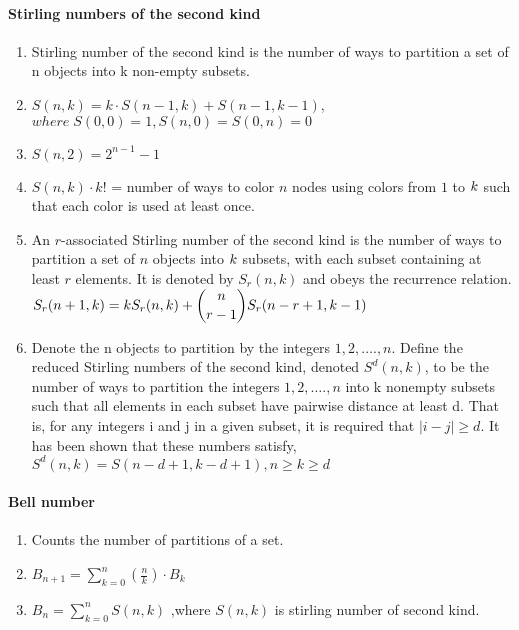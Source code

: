 \paragraph{Stirling numbers of the second kind}\begin{enumerate}

            
            \item Stirling number of the second kind is the number of ways to partition a set of n objects into k
                non-empty
                subsets.
            \item $S(n,k)=k \cdot S(n-1,k)+S(n-1,k-1)$,
                \(where \; S(0,0)=1,S(n,0)=S(0,n)=0\)
            \item $S(n,2)=2^{n-1}-1$
            \item $S(n,k) \cdot k!$ = number of ways to color $n$ nodes using colors from $\displaystyle 1$ to
                $\displaystyle
                \displaystyle k$ such that each color is used at least once.
            \item An $r$-associated Stirling number of the second kind is the number of ways to partition a set of $n$
                objects
                into $\displaystyle \displaystyle k$ subsets, with each subset containing at least $r$ elements. It is
                denoted
                by $S_r( n , k )$ and obeys the recurrence relation.
                $\displaystyle \displaystyle S_r(n+1,k) = k S_r(n,k) + \binom{n}{r-1} S_r(n-r+1,k-1)$
            \item 
                Denote the n objects to partition by the integers $\displaystyle 1, 2, …., n$. Define the reduced
                    Stirling
                    numbers of the second kind, denoted $S^d(n, k)$, to be the number of ways to partition the integers
                    $\displaystyle 1, 2, …., n$ into k nonempty subsets such that all elements in each subset have
                    pairwise
                    distance at least d.
                    That is, for any integers i and j in a given subset, it is required that $|i - j| \geq d$. It has
                    been
                    shown
                    that these numbers satisfy,
                    \(S^d(n, k) = S(n - d + 1, k - d + 1), n \geq k \geq d\)

                \end{enumerate}
\paragraph{Bell number}\begin{enumerate}

            
            \item Counts the number of partitions of a set.
            \item $B_{n+1}=\displaystyle\sum_{k=0}^{n}\left(\frac{n}{k}\right) \cdot B_{k}$
            \item 
                $B_{n}=\displaystyle\sum_{k=0}^{n}S(n,k)$ ,where $S(n,k)$ is stirling number of second kind.

            
        \end{enumerate}
